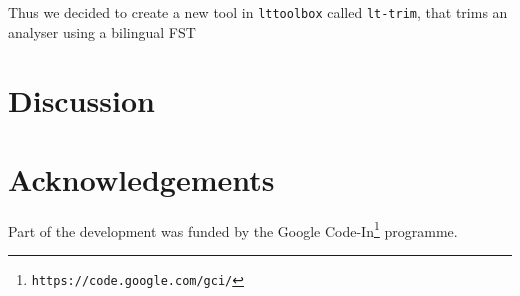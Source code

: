 \documentclass[10pt, a4paper]{article}
\begin{document}
Thus we decided to create a new tool in \texttt{lttoolbox} called
\texttt{lt-trim}, that trims an analyser using a bilingual FST

\section{Discussion}
\section*{Acknowledgements}
Part of the development was funded by the Google
Code-In\footnote{\texttt{https://code.google.com/gci/}} programme.



\end{document}

